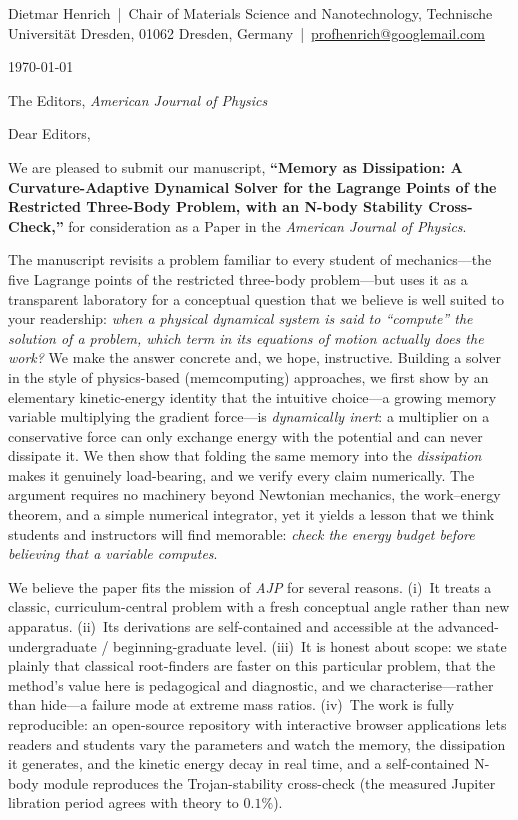 \documentclass[11pt]{article}
\begin{document}
{\noindent Dietmar Henrich \,|\, Chair of Materials Science and Nanotechnology,
Technische Universit\"{a}t Dresden, 01062 Dresden, Germany \,|\,
\href{mailto:profhenrich@googlemail.com}{profhenrich@googlemail.com}}

\vspace{0.8em}
\noindent \today

\vspace{0.8em}
\noindent The Editors, \emph{American Journal of Physics}

\noindent Dear Editors,

We are pleased to submit our manuscript, \textbf{``Memory as Dissipation: A
Curvature-Adaptive Dynamical Solver for the Lagrange Points of the Restricted
Three-Body Problem, with an N-body Stability Cross-Check,''} for consideration as
a Paper in the \emph{American Journal of Physics}.

The manuscript revisits a problem familiar to every student of mechanics---the
five Lagrange points of the restricted three-body problem---but uses it as a
transparent laboratory for a conceptual question that we believe is well suited
to your readership: \emph{when a physical dynamical system is said to ``compute''
the solution of a problem, which term in its equations of motion actually does
the work?} We make the answer concrete and, we hope, instructive. Building a
solver in the style of physics-based (memcomputing) approaches, we first show by
an elementary kinetic-energy identity that the intuitive choice---a growing
memory variable multiplying the gradient force---is \emph{dynamically inert}: a
multiplier on a conservative force can only exchange energy with the potential
and can never dissipate it. We then show that folding the same memory into the
\emph{dissipation} makes it genuinely load-bearing, and we verify every claim
numerically. The argument requires no machinery beyond Newtonian mechanics, the
work--energy theorem, and a simple numerical integrator, yet it yields a lesson
that we think students and instructors will find memorable: \emph{check the
energy budget before believing that a variable computes}.

We believe the paper fits the mission of \emph{AJP} for several reasons. (i)~It
treats a classic, curriculum-central problem with a fresh conceptual angle rather
than new apparatus. (ii)~Its derivations are self-contained and accessible at the
advanced-undergraduate / beginning-graduate level. (iii)~It is honest about
scope: we state plainly that classical root-finders are faster on this particular
problem, that the method's value here is pedagogical and diagnostic, and we
characterise---rather than hide---a failure mode at extreme mass ratios.
(iv)~The work is fully reproducible: an open-source repository with interactive
browser applications lets readers and students vary the parameters and watch the
memory, the dissipation it generates, and the kinetic energy decay in real time,
and a self-contained N-body module reproduces the Trojan-stability cross-check
(the measured Jupiter libration period agrees with theory to $0.1\%$).
\end{document}
